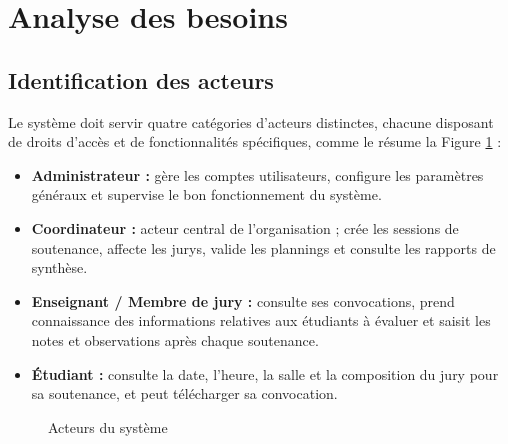 \documentclass[12pt,a4paper]{article}
\begin{document}
\section{Analyse des besoins}
\label{sec:besoins}

\subsection{Identification des acteurs}
\label{subsec:acteurs}

Le système doit servir quatre catégories d'acteurs distinctes, chacune disposant
de droits d'accès et de fonctionnalités spécifiques, comme le résume la Figure
\ref{fig:acteurs} :

\begin{itemize}[label=\textcolor{primary}{\textbullet}]
    \item \textbf{Administrateur :} gère les comptes utilisateurs, configure les
          paramètres généraux et supervise le bon fonctionnement du système.
    \item \textbf{Coordinateur :} acteur central de l'organisation ; crée les
          sessions de soutenance, affecte les jurys, valide les plannings et
          consulte les rapports de synthèse.
    \item \textbf{Enseignant / Membre de jury :} consulte ses convocations,
          prend connaissance des informations relatives aux étudiants à évaluer
          et saisit les notes et observations après chaque soutenance.
    \item \textbf{Étudiant :} consulte la date, l'heure, la salle et la
          composition du jury pour sa soutenance, et peut télécharger sa
          convocation.
\end{itemize}

\begin{figure}[H]
    \centering
    \caption{Acteurs du système}
    \label{fig:acteurs}
\end{figure}
\end{document}

